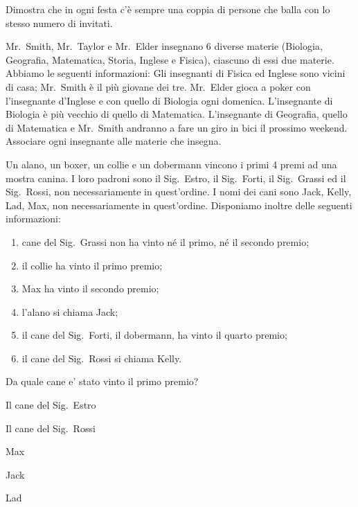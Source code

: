 \begin{esercizio}
\label{ese:0.28}
Dimostra che in ogni festa c'è sempre una coppia di persone che balla con lo stesso numero di invitati.
\end{esercizio}

\begin{esercizio}
\label{ese:0.29}
Mr.~Smith, Mr.~Taylor e Mr.~Elder insegnano 6 diverse materie (Biologia, Geografia, Matematica, Storia, Inglese e Fisica), ciascuno di essi due materie. Abbiamo le seguenti informazioni: Gli insegnanti di Fisica ed Inglese sono vicini di casa; Mr.~Smith è il più giovane dei tre. Mr.~Elder gioca a poker con l'insegnante d'Inglese e con quello di Biologia ogni domenica. L'insegnante di Biologia è più vecchio di quello di Matematica. L'insegnante di Geografia, quello di Matematica e Mr.~Smith andranno a fare un giro in bici il prossimo weekend. Associare ogni insegnante alle materie che insegna.
\end{esercizio}

\begin{esercizio}
\label{ese:0.30}
Un alano, un boxer, un collie e un dobermann vincono i primi 4 premi ad una mostra canina. I loro padroni sono il Sig.~Estro, il Sig.~Forti, il Sig.~Grassi ed il Sig.~Rossi, non necessariamente in quest'ordine. I nomi dei cani sono Jack, Kelly, Lad, Max, non necessariamente in quest'ordine. Disponiamo inoltre delle seguenti informazioni:
\begin{enumerate}
\item cane del Sig.~Grassi non ha vinto né il primo, né il secondo premio;
\item il collie ha vinto il primo premio;
\item Max ha vinto il secondo premio;
\item l'alano si chiama Jack;
\item il cane del Sig.~Forti, il dobermann, ha vinto il quarto premio;
\item il cane del Sig.~Rossi si chiama Kelly.
\end{enumerate}
Da quale cane e' stato vinto il primo premio?
\begin{multicols}{2}
\begin{enumeratea}
\item Il cane del Sig.~Estro
\item Il cane del Sig.~Rossi
\item Max
\item Jack
\item Lad
\end{enumeratea}
\end{multicols}
\end{esercizio}

